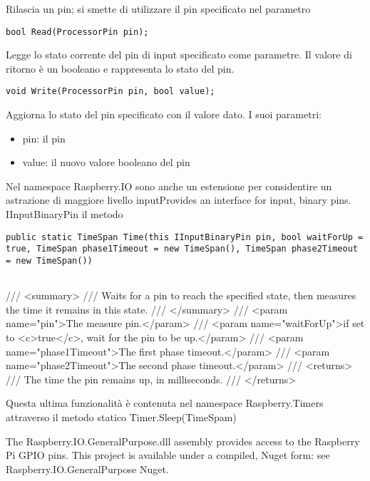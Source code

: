    Rilascia un pin; si smette di utilizzare il pin specificato nel parametro
 
   
 
      
  \begin{lstlisting}[frame=none]
   bool Read(ProcessorPin pin);
  \end{lstlisting}
  
   Legge lo stato corrente del pin di input specificato come parametre. Il valore di ritorno è un booleano e rappresenta lo stato del pin. 
  

\begin{lstlisting}[frame=none]
void Write(ProcessorPin pin, bool value);
\end{lstlisting}
Aggiorna lo stato del pin specificato con il valore dato. I suoi parametri:
\begin{itemize}
\item	pin: il pin
\item	value: il nuovo valore booleano del pin
\end{itemize}
  
 Nel namespace Raspberry.IO sono anche un estensione per considentire un astrazione di maggiore livello
 inputProvides an interface for input, binary pins.
 IInputBinaryPin il metodo 


 \begin{lstlisting}[frame=none]
  public static TimeSpan Time(this IInputBinaryPin pin, bool waitForUp = true, TimeSpan phase1Timeout = new TimeSpan(), TimeSpan phase2Timeout = new TimeSpan())
 
 \end{lstlisting}
  /// <summary>
/// Waits for a pin to reach the specified state, then measures the time it remains in this state.
/// </summary>
/// <param name="pin">The measure pin.</param>
/// <param name="waitForUp">if set to <c>true</c>, wait for the pin to be up.</param>
/// <param name="phase1Timeout">The first phase timeout.</param>
/// <param name="phase2Timeout">The second phase timeout.</param>
/// <returns>
/// The time the pin remains up, in milliseconds.
/// </returns>
  


Questa ultima funzionalità è contenuta nel namespace Raspberry.Timers  
attraverso il metodo statico
Timer.Sleep(TimeSpam)

The Raspberry.IO.GeneralPurpose.dll assembly provides access to the Raspberry Pi GPIO pins. 
This project is available under a compiled, Nuget form: see Raspberry.IO.GeneralPurpose Nuget.

